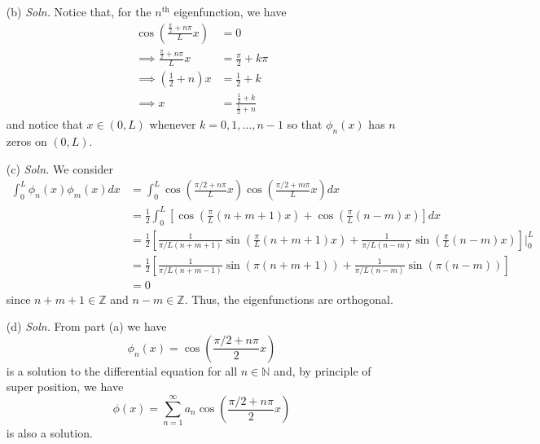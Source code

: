 \documentclass{article}
\begin{document}
\begin{itemize}
\begin{itemize}
        \item[(b)] \textit{Soln.} Notice that, for the $n^{\text{th}}$ eigenfunction, we have
        \begin{align*}
            \cos\left(\frac{\frac{\pi}{2} + n\pi}{L}x\right) &= 0\\
            \implies \frac{\frac{\pi}{2} + n\pi}{L}x &= \frac{\pi}{2} + k\pi\\
            \implies \left(\frac{1}{2} + n\right)x &= \frac{1}{2} + k\\
            \implies x &= \frac{\frac{1}{2} + k}{\frac{1}{2} + n}
        \end{align*}
        and notice that $x \in (0, L)$ whenever $k = 0, 1, \dots, n-1$ so that $\phi_n(x)$ has $n$ zeros on $(0,L)$.

        \item[(c)] \textit{Soln.} We consider
        \begin{align*}
            \int_0^L \phi_n(x)\phi_m(x)dx &= \int_0^L \cos\left(\frac{\pi/2 + n\pi}{L}x\right)\cos\left(\frac{\pi/2 + m\pi}{L}x\right)dx\\
            &= \frac{1}{2}\int_0^L\left[\cos\left(\frac{\pi}{L}(n + m + 1)x\right) + \cos\left(\frac{\pi}{L}(n - m)x\right)\right]dx\\
            &= \frac{1}{2}\left[\frac{1}{\pi/L(n + m + 1)}\sin\left(\frac{\pi}{L}(n + m + 1)x\right) + \frac{1}{\pi/L(n - m)}\sin\left(\frac{\pi}{L}(n - m)x\right)\right]\bigg|_0^L\\
            &= \frac{1}{2}\left[\frac{1}{\pi/L(n + m - 1)}\sin(\pi (n + m + 1)) + \frac{1}{\pi/L(n - m)}\sin(\pi(n - m))\right]\\
            &= 0 
        \end{align*}
        since $n + m + 1 \in \mathbb{Z}$ and $n - m \in \mathbb{Z}$. Thus, the eigenfunctions are orthogonal.

        \item[(d)] \textit{Soln.} From part (a) we have 
        \[\phi_n(x) = \cos\left(\frac{\pi/2 + n\pi}{2}x\right)\]
        is a solution to the differential equation for all $n \in \mathbb{N}$ and, by principle of super position, we have
        \[\phi(x) = \sum_{n = 1}^{\infty} a_n\cos\left(\frac{\pi/2 + n\pi}{2}x\right)\]
        is also a solution.


\end{itemize}
\end{itemize}
\end{document}
